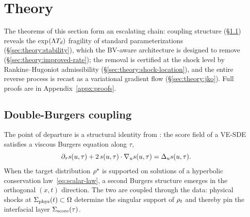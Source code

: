 %
%
\section{Theory}
\label{sec:theory}

The theorems of this section form an escalating chain: coupling structure (§\ref{sec:theory:dburg}) reveals the exp$(\Lambda T_{d})$ fragility of standard parameterizations (§\ref{sec:theory:stability}), which the BV-aware architecture is designed to remove (§\ref{sec:theory:improved-rate}); the removal is certified at the shock level by Rankine--Hugoniot admissibility (§\ref{sec:theory:shock-location}), and the entire reverse process is recast as a variational gradient flow (§\ref{sec:theory:jko}). Full proofs are in Appendix~\ref{appx:proofs}.

\subsection{Double-Burgers coupling}
\label{sec:theory:dburg}

The point of departure is a structural identity from \citet{sarkar2026scoreshocks}: the score field of a {VE-SDE} satisfies a viscous Burgers equation along $\tau$,
\begin{equation}
  \label{eq:score-burgers}
  \partial_{\tau}s(u,\tau) + 2\,s(u,\tau)\cdot\nabla_us(u,\tau) = \Delta_us(u,\tau).
\end{equation}
When the target distribution $\rho^{\star}$ is supported on solutions of a hyperbolic conservation law~\eqref{eq:scalar-law}, a second Burgers structure emerges in the orthogonal $(x,t)$ direction. The two are coupled through the data: physical shocks at $\Sigma_{\mathrm{phys}}(t)\subset\Omega$ determine the singular support of $\rho_{t}$ and thereby pin the interfacial layer $\Sigma_{\mathrm{score}}(\tau)$.

